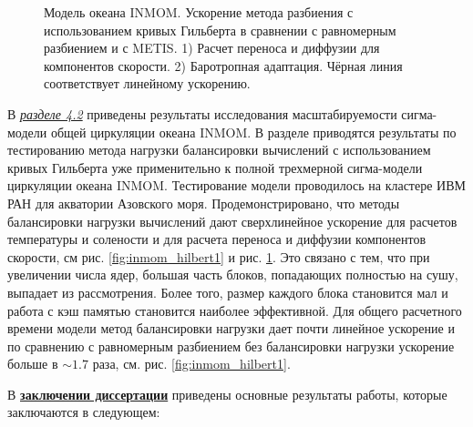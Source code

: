      \begin{figure}[htb!]
    \begin{minipage}[h]{0.48\linewidth}
    \end{minipage}
    \hfill
    \begin{minipage}[h]{0.48\linewidth}
    \end{minipage}
    \caption{Модель океана INMOM. Ускорение метода разбиения с использованием кривых Гильберта в сравнении с равномерным разбиением и с METIS. 1) Расчет переноса и диффузии для компонентов скорости. 2) Баротропная адаптация. 
    Чёрная линия соответствует линейному ускорению.}
    \label{fig:inmom_hilbert2}
    \end{figure}
    
В \underline{\textit{разделе 4.2}} приведены результаты исследования масштабируемости сигма-модели общей циркуляции океана INMOM.
В разделе приводятся результаты по тестированию метода нагрузки балансировки вычислений с использованием кривых Гильберта уже примени­тельно к полной трехмерной сигма-модели циркуляции океана INMOM. Тестирование модели проводилось на кластере ИВМ РАН для акватории Азовского моря.
Продемонстрировано, что методы балансировки нагрузки вычислений дают сверхлинейное ускорение для расче­тов температуры и солености и для расчета переноса и диффузии компонентов скорости, см рис. \ref{fig:inmom_hilbert1} и рис. \ref{fig:inmom_hilbert2}.
Это связано с тем, что при увеличении числа ядер, большая часть блоков, попадающих полностью на сушу, выпадает из рассмотрения. Более то­го, размер каждого блока становится мал и работа с кэш памятью становится наиболее эффективной.
Для общего расчетного времени модели метод балансировки нагрузки дает почти линейное ускорение и по сравнению с равномерным разбиением без балансировки нагрузки ускорение больше в $\sim 1.7$ раза, см. рис. \ref{fig:inmom_hilbert1}.

\FloatBarrier
{}                                  %
В \underline{\textbf{заключении диссертации}} приведены основные результаты работы, которые заключаются в следующем:





